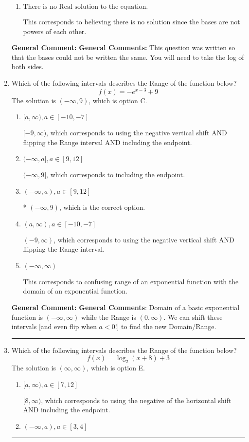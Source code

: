 \documentclass{extbook}[14pt]
\newcommand{\litem}[1]{\item #1

\rule{\textwidth}{0.4pt}}
\begin{document}
\begin{enumerate}
{\begin{enumerate}[label=\Alph*.]
$x = -0.837$, which corresponds to distributing the $\ln(base)$ to the first term of the exponent only.
\item \( \text{There is no Real solution to the equation.} \)

This corresponds to believing there is no solution since the bases are not powers of each other.
\end{enumerate}

\textbf{General Comment:} \textbf{General Comments:} This question was written so that the bases could not be written the same. You will need to take the log of both sides.
}
\litem{
Which of the following intervals describes the Range of the function below?
\[ f(x) = -e^{x-3}+9 \]The solution is \( (-\infty, 9) \), which is option C.\begin{enumerate}[label=\Alph*.]
\item \( [a, \infty), a \in [-10, -7] \)

$[-9, \infty)$, which corresponds to using the negative vertical shift AND flipping the Range interval AND including the endpoint.
\item \( (-\infty, a], a \in [9, 12] \)

$(-\infty, 9]$, which corresponds to including the endpoint.
\item \( (-\infty, a), a \in [9, 12] \)

* $(-\infty, 9)$, which is the correct option.
\item \( (a, \infty), a \in [-10, -7] \)

$(-9, \infty)$, which corresponds to using the negative vertical shift AND flipping the Range interval.
\item \( (-\infty, \infty) \)

This corresponds to confusing range of an exponential function with the domain of an exponential function.
\end{enumerate}

\textbf{General Comment:} \textbf{General Comments}: Domain of a basic exponential function is $(-\infty, \infty)$ while the Range is $(0, \infty)$. We can shift these intervals [and even flip when $a<0$!] to find the new Domain/Range.
}
\litem{
Which of the following intervals describes the Range of the function below?
\[ f(x) = \log_2{(x+8)}+3 \]The solution is \( (\infty, \infty) \), which is option E.\begin{enumerate}[label=\Alph*.]
\item \( [a, \infty), a \in [7, 12] \)

$[8, \infty)$, which corresponds to using the negative of the horizontal shift AND including the endpoint.
\item \( (-\infty, a), a \in [3, 4] \)


\end{enumerate}}
\end{enumerate}
\end{document}

